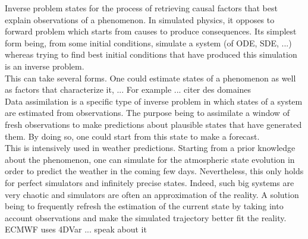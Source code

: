 Inverse problem states for the process of retrieving causal factors that best explain observations 
of a phenomenon. In simulated physics, it opposes to forward problem which starts from causes
to produce consequences. Its simplest form being, from some initial conditions, simulate a system (of ODE, SDE, ...) 
whereas trying to find best initial conditions that have produced this simulation
is an inverse problem.\\

This can take several forms. One could estimate states of a phenomenon as well as factors
that characterize it, ...
For example ... citer des domaines\\

Data assimilation is a specific type of inverse problem in which states of a system are estimated
from observations. The purpose being to assimilate a window of fresh observations to make predictions 
about plausible states that have generated them. By doing so, one could start from this state to make
a forecast.\\ 
This is intensively used in weather predictions. Starting from a prior knowledge about the
phenomenon, one can simulate for the atmospheric state evolution in order to predict the weather in the 
coming few days. Nevertheless, this only holds for perfect simulators and infinitely precise states.
Indeed, such big systems are very chaotic and simulators are often an approximation of the reality.
A solution being to frequently refresh the estimation of the current state by taking into account
observations and make the simulated trajectory better fit the reality. ECMWF uses 4DVar ... speak about it


